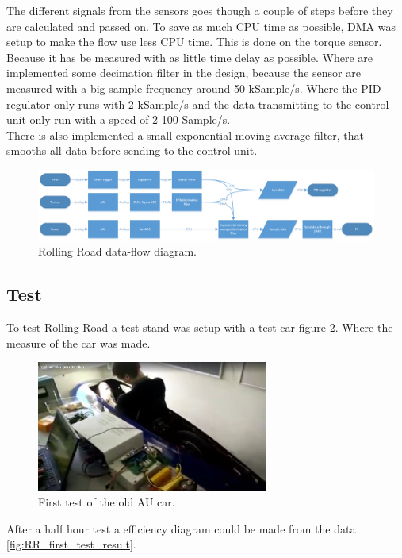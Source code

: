 The different signals from the sensors goes though a couple of steps before they are calculated and passed on. To save as much CPU time as possible, DMA was setup to make the flow use less CPU time. This is done on the torque sensor. Because it has be measured with as little time delay as possible. Where are implemented some decimation filter in the design, because the sensor are measured with a big sample frequency around 50 kSample/s. Where the PID regulator only runs with 2 kSample/s and the data transmitting to the control unit only run with a speed of 2-100 Sample/s.\\
There is also implemented a small exponential moving average filter, that smooths all data before sending to the control unit.    
\begin{figure}[H]
	\centering
	\includegraphics [width=6in]{../Documentation_RR/Software/Pictures/data-flow.png}
	\caption{Rolling Road data-flow diagram.}
	\label{fig:data_flow_diagram}
\end{figure}
\subsection{Test}
To test Rolling Road a test stand was setup with a test car figure \ref{fig:RR_first_test}. Where the measure of the car was made.  
\begin{figure}[H]
	\centering
	\includegraphics [width=3in]{SubPages/Images/jens_test.png}
	\caption{First test of the old AU car.}
	\label{fig:RR_first_test}
\end{figure}
After a half hour test a efficiency diagram could be made from the data \ref{fig:RR_first_test_result}.

